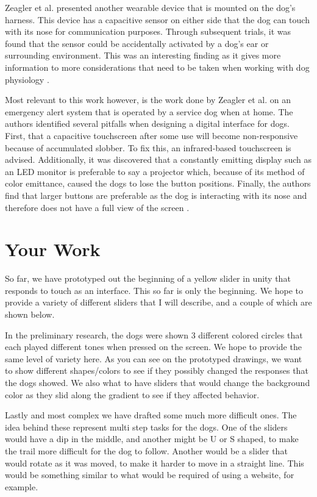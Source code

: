 \documentclass{sigchi}
\begin{document}
        Zeagler et al. presented another wearable device that is mounted on the dog’s harness. This device has a capacitive sensor on either side that the dog can touch with its nose for communication purposes. Through subsequent trials, it was found that the sensor could be accidentally activated by a dog’s ear or surrounding environment. This was an interesting finding as it gives more information to more considerations that need to be taken when working with dog physiology \cite{Zeagler2016a}.
        
        Most relevant to this work however, is the work done by Zeagler et al. on an emergency alert system that is operated by a service dog when at home. The authors identified several pitfalls when designing a digital interface for dogs. First, that a capacitive touchscreen after some use will become non-responsive because of accumulated slobber. To fix this, an infrared-based touchscreen is advised. Additionally, it was discovered that a constantly emitting display such as an LED monitor is preferable to say a projector which, because of its method of color emittance, caused the dogs to lose the button positions. Finally, the authors find that larger buttons are preferable as the dog is interacting with its nose and therefore does not have a full view of the screen \cite{Zeagler2014}.

    \section{Your Work}
        So far, we have prototyped out the beginning of a yellow slider in unity that responds to touch as an interface. This so far is only the beginning. We hope to provide a variety of different sliders that I will describe, and a couple of which are shown below.

        In the preliminary research, the dogs were shown 3 different colored circles that each played different tones when pressed on the screen. We hope to provide the same level of variety here. As you can see on the prototyped drawings, we want to show different shapes/colors to see if they possibly changed the responses that the dogs showed. We also what to have sliders that would change the background color as they slid along the gradient to see if they affected behavior.

        Lastly and most complex we have drafted some much more difficult ones. The idea behind these represent multi step tasks for the dogs. One of the sliders would have a dip in the middle, and another might be U or S shaped, to make the trail more difficult for the dog to follow. Another would be a slider that would rotate as it was moved, to make it harder to move in a straight line. This would be something similar to what would be required of using a website, for example.
    
\end{document}
